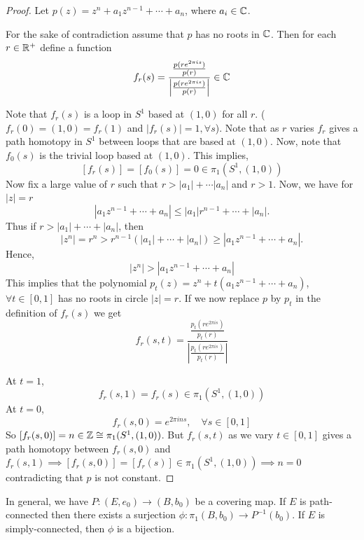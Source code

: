 \documentclass[12pt]{amsart}
\begin{document}
\begin{proof}
    Let $p(z) = z^n + a_1z^{n-1} + \cdots + a_n$, where $a_i \in \mathbb C$. 
    
    For the sake of contradiction assume that $p$ has no roots in $\mathbb C$. Then for each $r \in \mathbb R^+$ define a function 
    \[f_r(s) = \frac{\frac{p(r e^{2 \pi i s})}{p(r)}}{\left|\frac{p (r e^{2 \pi i s})}{p(r)}\right|} \in \mathbb C\]

    Note that $f_r(s)$ is a loop in $S^1$ based at $(1,0)$ for all $r$. ($f_r(0) = (1,0) = f_r(1)$ and $|f_r(s)| = 1, \forall s$). 
    Note that as $r$ varies $f_r$ gives a path homotopy in $S^1$ between loops that are based at $(1,0)$. Now, note that $f_0(s)$ is the trivial loop based at $(1,0)$. This implies, 
    \[[f_r(s)] = [f_0(s)] = 0 \in \pi_1(S^1, (1,0))\]
    Now fix a large value of $r$ such that $r > |a_1| + \cdots |a_n|$ and $r > 1$. Now, we have for $|z| = r$ 
    \[
|a_1 z^{n-1} + \cdots + a_n|
\le |a_1|r^{n-1} + \cdots + |a_n|.
\]
Thus if $r > |a_1| + \cdots + |a_n|$, then
\[
|z^n| = r^n > r^{n-1}(|a_1| + \cdots + |a_n|)
\ge |a_1 z^{n-1} + \cdots + a_n|.
\]
    Hence,
    \[|z^n| > |a_1z^{n-1} + \cdots + a_n|\]
    This implies that the polynomial $p_t(z) = z^n + t(a_1z^{n-1} + \cdots +a_n)$, $\forall t \in [0,1]$ has no roots in circle $|z| = r$. If we now replace $p$ by $p_t$ in the definition of $f_r(s)$ we get 
    \[f_r(s,t) = \frac{\frac{p_t(r e^{2 \pi i s})}{p_t(r)}}{\left|\frac{p_t (r e^{2 \pi i s})}{p_t(r)}\right|}\]

    At $t = 1$,
    \[f_r(s, 1) = f_r(s) \in \pi_1(S^1, (1,0))\]
    At $t = 0$, 
    \[f_r(s, 0) = e^{2 \pi i n s}, \quad \forall s \in [0,1]\]
    So $[f_r(s,0)] = n \in \mathbb Z \cong \pi_1(S^1, (1,0))$. But $f_r(s,t)$ as we vary $t \in [0,1]$ gives a path homotopy between $f_r(s,0)$ and $f_r(s,1) \implies [f_r(s,0)] = [f_r(s)] \in \pi_1(S^1, (1,0)) \implies n =0$ contradicting that $p$ is not constant. 
\end{proof}

\begin{remark}
    In general, we have $P:(E, e_0) \to (B, b_0)$ be a covering map. If $E$ is path-connected then there exists a surjection $\phi: \pi_1(B, b_0) \to P^{-1}(b_0)$. If $E$ is simply-connected, then $\phi$ is a bijection. 
\end{remark}
\end{document}
